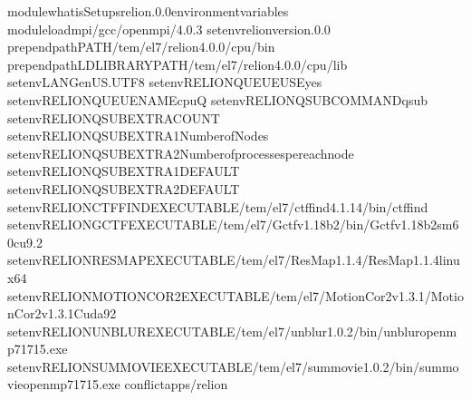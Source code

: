 \documentclass[a4paper,10pt,english]{sphinxmanual}
\begin{document}
\begin{sphinxVerbatim}[commandchars=\\\{\}]
module\PYGZhy{}whatisSetupsrelion.0.0environmentvariables
moduleloadmpi/gcc/openmpi/4.0.3
setenvrelion\PYGZus{}version.0.0
prepend\PYGZhy{}pathPATH/tem/el7/relion\PYGZhy{}4.0.0/cpu/bin
prepend\PYGZhy{}pathLD\PYGZus{}LIBRARY\PYGZus{}PATH/tem/el7/relion\PYGZhy{}4.0.0/cpu/lib
setenvLANGen\PYGZus{}US.UTF\PYGZhy{}8
setenvRELION\PYGZus{}QUEUE\PYGZus{}USEyes
setenvRELION\PYGZus{}QUEUE\PYGZus{}NAMEcpuQ
setenvRELION\PYGZus{}QSUB\PYGZus{}COMMANDqsub
setenvRELION\PYGZus{}QSUB\PYGZus{}EXTRA\PYGZus{}COUNT
setenvRELION\PYGZus{}QSUB\PYGZus{}EXTRA1NumberofNodes
setenvRELION\PYGZus{}QSUB\PYGZus{}EXTRA2Numberofprocessespereachnode
setenvRELION\PYGZus{}QSUB\PYGZus{}EXTRA1\PYGZus{}DEFAULT
setenvRELION\PYGZus{}QSUB\PYGZus{}EXTRA2\PYGZus{}DEFAULT
setenvRELION\PYGZus{}CTFFIND\PYGZus{}EXECUTABLE/tem/el7/ctffind\PYGZhy{}4.1.14/bin/ctffind
setenvRELION\PYGZus{}GCTF\PYGZus{}EXECUTABLE/tem/el7/Gctf\PYGZus{}v1.18\PYGZus{}b2/bin/Gctf\PYGZus{}v1.18\PYGZus{}b2\PYGZus{}sm60\PYGZus{}cu9.2
setenvRELION\PYGZus{}RESMAP\PYGZus{}EXECUTABLE/tem/el7/ResMap\PYGZhy{}1.1.4/ResMap\PYGZhy{}1.1.4\PYGZhy{}linux64
setenvRELION\PYGZus{}MOTIONCOR2\PYGZus{}EXECUTABLE/tem/el7/MotionCor2\PYGZus{}v1.3.1/MotionCor2\PYGZus{}v1.3.1\PYGZhy{}Cuda92
setenvRELION\PYGZus{}UNBLUR\PYGZus{}EXECUTABLE/tem/el7/unblur\PYGZus{}1.0.2/bin/unblur\PYGZus{}openmp\PYGZus{}7\PYGZus{}17\PYGZus{}15.exe
setenvRELION\PYGZus{}SUMMOVIE\PYGZus{}EXECUTABLE/tem/el7/summovie\PYGZus{}1.0.2/bin/sum\PYGZus{}movie\PYGZus{}openmp\PYGZus{}7\PYGZus{}17\PYGZus{}15.exe
conflictapps/relion
\PYGZhy{}\PYGZhy{}\PYGZhy{}\PYGZhy{}\PYGZhy{}\PYGZhy{}\PYGZhy{}\PYGZhy{}\PYGZhy{}\PYGZhy{}\PYGZhy{}\PYGZhy{}\PYGZhy{}\PYGZhy{}\PYGZhy{}\PYGZhy{}\PYGZhy{}\PYGZhy{}\PYGZhy{}\PYGZhy{}\PYGZhy{}\PYGZhy{}\PYGZhy{}\PYGZhy{}\PYGZhy{}\PYGZhy{}\PYGZhy{}\PYGZhy{}\PYGZhy{}\PYGZhy{}\PYGZhy{}\PYGZhy{}\PYGZhy{}\PYGZhy{}\PYGZhy{}\PYGZhy{}\PYGZhy{}\PYGZhy{}\PYGZhy{}\PYGZhy{}\PYGZhy{}\PYGZhy{}\PYGZhy{}\PYGZhy{}\PYGZhy{}\PYGZhy{}\PYGZhy{}\PYGZhy{}\PYGZhy{}\PYGZhy{}\PYGZhy{}\PYGZhy{}\PYGZhy{}\PYGZhy{}\PYGZhy{}\PYGZhy{}\PYGZhy{}\PYGZhy{}\PYGZhy{}\PYGZhy{}\PYGZhy{}\PYGZhy{}\PYGZhy{}\PYGZhy{}\PYGZhy{}\PYGZhy{}\PYGZhy{}
\end{sphinxVerbatim}
\end{document}
